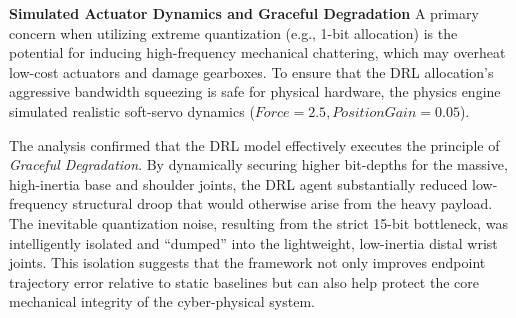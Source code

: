 \noindent\textbf{Simulated Actuator Dynamics and Graceful Degradation}
A primary concern when utilizing extreme quantization (e.g., 1-bit allocation) is the potential for inducing high-frequency mechanical chattering, 
which may overheat low-cost actuators and damage gearboxes. To ensure that the DRL allocation's aggressive bandwidth squeezing is safe for physical 
hardware, the physics engine simulated realistic soft-servo dynamics ($Force=2.5, PositionGain=0.05$).

The analysis confirmed that the DRL model effectively executes the principle of \textit{Graceful Degradation}. By dynamically securing higher 
bit-depths for the massive, high-inertia base and shoulder joints, the DRL agent substantially reduced low-frequency structural droop that would otherwise arise from the heavy payload. The inevitable quantization noise, resulting from the strict 15-bit bottleneck, was 
intelligently isolated and ``dumped'' into the lightweight, low-inertia distal wrist joints. This isolation suggests that the framework not only improves 
endpoint trajectory error relative to static baselines but can also help protect the core mechanical integrity of the cyber-physical system.
